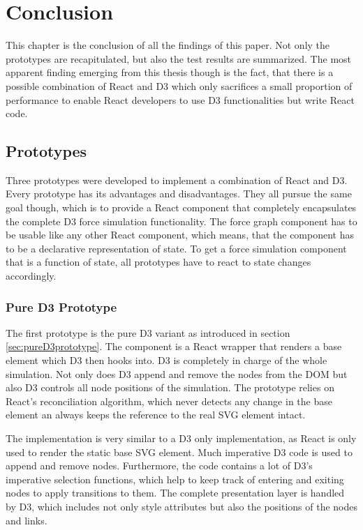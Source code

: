\chapter{Conclusion}
\label{cha:conclusion}

This chapter is the conclusion of all the findings of this paper. Not only the prototypes are recapitulated, but also the test results are summarized. The most apparent finding emerging from this thesis though is the fact, that there is a possible combination of React and D3 which only sacrifices a small proportion of performance to enable React developers to use D3 functionalities but write React code.

\section{Prototypes}

Three prototypes were developed to implement a combination of React and D3. Every prototype has its advantages and disadvantages. They all pursue the same goal though, which is to provide a React component that completely encapsulates the complete D3 force simulation functionality. The force graph component has to be usable like any other React component, which means, that the component has to be a declarative representation of state. To get a force simulation component that is a function of state, all prototypes have to react to state changes accordingly.

\subsection{Pure D3 Prototype}

The first prototype is the pure D3 variant as introduced in section \ref{sec:pureD3prototype}. The component is a React wrapper that renders a base element which D3 then hooks into. D3 is completely in charge of the whole simulation. Not only does D3 append and remove the nodes from the DOM but also D3 controls all node positions of the simulation. The prototype relies on React's reconciliation algorithm, which never detects any change in the base element an always keeps the reference to the real SVG element intact.

The implementation is very similar to a D3 only implementation, as React is only used to render the static base SVG element. Much imperative D3 code is used to append and remove nodes. Furthermore, the code contains a lot of D3's imperative selection functions, which help to keep track of entering and exiting nodes to apply transitions to them. The complete presentation layer is handled by D3, which includes not only style attributes but also the positions of the nodes and links.

